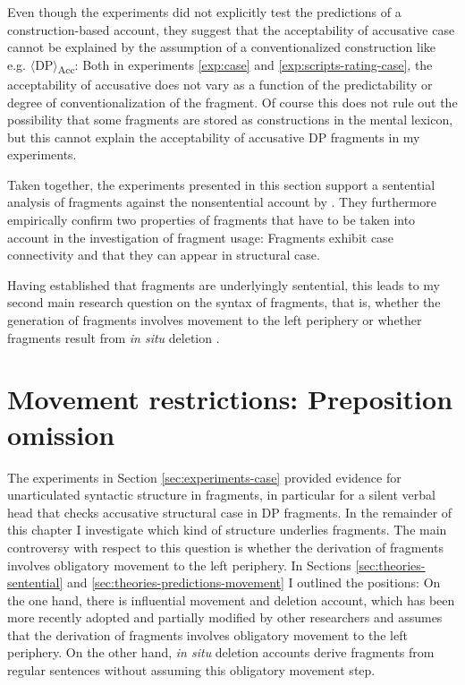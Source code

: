 Even though the experiments did not explicitly test the predictions of a con\-struc\-tion-based account, they suggest that the acceptability of accusative case cannot be explained by the assumption of a conventionalized construction like e.g. $\langle$DP$\rangle$\textsubscript{Acc}: Both in experiments \ref{exp:case} and \ref{exp:scripts-rating-case}, the acceptability of accusative does not vary as a function of the predictability or degree of conventionalization of the fragment. Of course this does not rule out the possibility that some fragments are stored as constructions in the mental lexicon, but this cannot explain the acceptability of accusative DP fragments in my experiments.

Taken together, the experiments presented in this section support a sentential analysis of fragments against the nonsentential account by \citet{barton.progovac2005}. They furthermore empirically confirm two properties of fragments that have to be taken into account in the investigation of fragment usage: Fragments exhibit case connectivity and that they can appear in structural case.

Having established that fragments are underlyingly sentential, this leads to my second main research question on the syntax of fragments, that is, whether the generation of fragments involves movement to the left periphery \citep{merchant2004} or whether fragments result from \textit{in situ} deletion \citep{reich2007}.

\section{Movement restrictions: Preposition omission}
\label{sec:pstranding}

The experiments in Section \ref{sec:experiments-case} provided evidence for unarticulated syntactic structure in fragments, in particular for a silent verbal head that checks accusative structural case in DP fragments. In the remainder of this chapter I investigate which kind of structure underlies fragments. The main controversy with respect to this question is whether the derivation of fragments involves obligatory movement to the left periphery. In Sections \ref{sec:theories-sentential} and \ref{sec:theories-predictions-movement} I outlined the positions: On the one hand, there is  influential movement and deletion account, which has been more recently adopted and partially modified by other researchers \citep[see e.g.][]{aelbrecht2009, sato2011,weir2014, doring2016, saab.liptak2016,  murphy2018} and assumes that the derivation of fragments involves obligatory movement to the left periphery. On the other hand, \textit{in situ} deletion accounts \citep{reich2007, ott.struckmeier2016, griffiths.etal2018} derive fragments from regular sentences without assuming this obligatory movement step.

